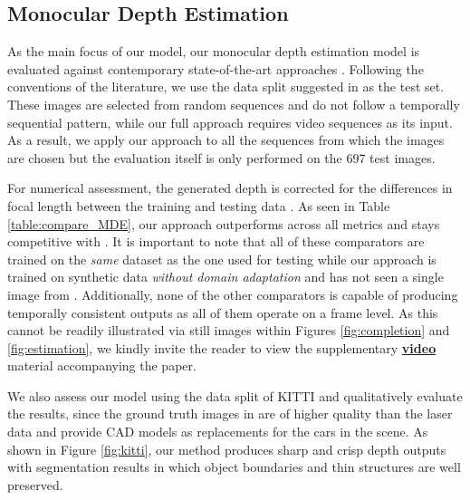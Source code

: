\documentclass[10pt,twocolumn,letterpaper]{article}
\begin{document}
{\subsection{Monocular Depth Estimation}
\label{ssec:estimation_results}\vspace{0.0cm}

As the main focus of our model, our monocular depth estimation model is evaluated against contemporary state-of-the-art approaches \cite{atapour2018real, eigen2014depth, monodepth17, liu2016learning, zhan2018unsupervised, zhou2017unsupervised}. Following the conventions of the literature, we use the data split suggested in \cite{eigen2014depth} as the test set. These images are selected from random sequences and do not follow a temporally sequential pattern, while our full approach requires video sequences as its input. As a result, we apply our approach to all the sequences from which the images are chosen but the evaluation itself is only performed on the 697 test images.

For numerical assessment, the generated depth is corrected for the differences in focal length between the training \cite{RosCVPR16} and testing data \cite{Geiger2013IJRR}. As seen in Table \ref{table:compare_MDE}, our approach outperforms \cite{eigen2014depth, liu2016learning, zhou2017unsupervised} across all metrics and stays competitive with \cite{monodepth17, zhan2018unsupervised}. It is important to note that all of these comparators are trained on the \emph{same} dataset as the one used for testing \cite{Geiger2013IJRR} while our approach is trained on synthetic data \cite{RosCVPR16} \emph{without domain adaptation} and has not seen a single image from \cite{Geiger2013IJRR}. Additionally, none of the other comparators is capable of producing temporally consistent outputs as all of them operate on a frame level. As this cannot be readily illustrated via still images within Figures \ref{fig:completion} and \ref{fig:estimation}, we kindly invite the reader to view the supplementary \href{https://vimeo.com/325161805}{\textbf{video}} material accompanying the paper.

We also assess our model using the data split of KITTI \cite{Menze2018JPRS} and qualitatively evaluate the results, since the ground truth images in \cite{Menze2018JPRS} are of higher quality than the laser data and provide CAD models as replacements for the cars in the scene. As shown in Figure \ref{fig:kitti}, our method produces sharp and crisp depth outputs with segmentation results in which object boundaries and thin structures are well preserved.\vspace{-0.1cm}

}
\end{document}

